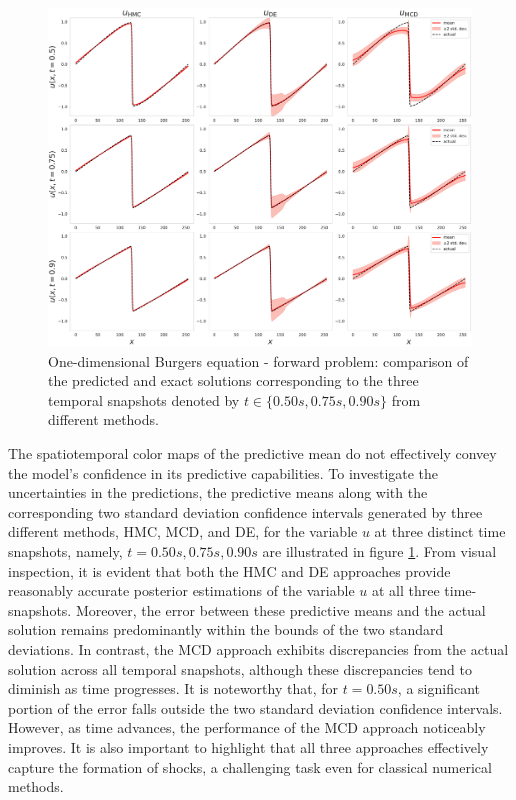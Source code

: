 \documentclass{article}
\begin{document}
%
\begin{figure}
\includegraphics[width=\linewidth]{images/Burgers_1d_comparison-5.pdf}
\caption{One-dimensional Burgers equation - forward problem: comparison of the predicted and exact solutions corresponding to the three temporal snapshots denoted by $t \in \{0.50s, 0.75s, 0.90s\}$ from different methods.}
\label{fig:1D-comparision}
\end{figure}
%
The spatiotemporal color maps of the predictive mean do not effectively convey the model's confidence in its predictive capabilities.
To investigate the uncertainties in the predictions, the predictive means along with the corresponding two standard deviation confidence intervals generated by three different methods, HMC, MCD, and DE, for the variable $u$ at three distinct time snapshots, namely, $t = 0.50s, 0.75s, 0.90s$ are illustrated in figure  \ref{fig:1D-comparision}.
From visual inspection, it is evident that both the HMC and DE approaches provide reasonably accurate posterior estimations of the variable $u$ at all three time-snapshots. 
Moreover, the error between these predictive means and the actual solution remains predominantly within the bounds of the two standard deviations.
In contrast, the MCD approach exhibits discrepancies from the actual solution across all temporal snapshots, although these discrepancies tend to diminish as time progresses. 
It is noteworthy that, for $t = 0.50s$, a significant portion of the error falls outside the two standard deviation confidence intervals.
However, as time advances, the performance of the MCD approach noticeably improves. It is also important to highlight that all three approaches effectively capture the formation of shocks, a challenging task even for classical numerical methods.
\end{document}
